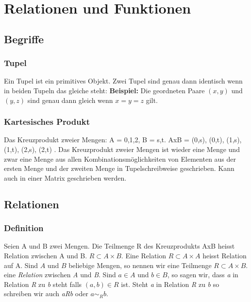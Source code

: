 \chapter{Relationen und Funktionen}
\section{Begriffe}
\subsection{Tupel}
Ein Tupel ist ein primitives Objekt. Zwei Tupel sind genau dann identisch wenn in beiden Tupeln das gleiche steht:
\textbf{Beispiel:} Die geordneten Paare \( (x,y) \) und \( (y,z) \) sind genau dann gleich wenn \( x = y = z \)	gilt.
\subsection{Kartesisches Produkt}
Das Kreuzprodukt zweier Mengen: A = {0,1,2}, B = {s,t}. AxB = { (0,s), (0,t), (1,s), (1,t), (2,s), (2,t) }. Das Kreuzprodukt  zweier Mengen ist wieder eine Menge und zwar eine Menge aus allen Kombinationsmöglichkeiten von Elementen aus der ersten Menge und der zweiten Menge in Tupelschreibweise geschrieben. Kann auch in einer Matrix geschrieben werden.
\section{Relationen}
\subsection{Definition}
Seien A und B zwei Mengen. Die Teilmenge R des Kreuzprodukts AxB heisst Relation zwischen A und B.
\(R \subset A \times B\).\newline
Eine Relation \(R \subset A \times A\) heisst Relation auf A. Sind \(A \) und \( B \) beliebige Mengen, so nennen wir eine Teilmenge \(R \subset A \times B. \) eine \emph{Relation} zwischen \emph{A} und \emph{B}. Sind \(a \in A \) und \(b \in B \), so sagen wir, dass \emph{a} in Relation \emph{R} zu \emph{b} steht falls \( (a, b) \in R \) ist. Steht \emph{a} in Relation \emph{R} zu \emph{b} so schreiben wir auch \emph{aRb} oder \(a \sim_R b \).

